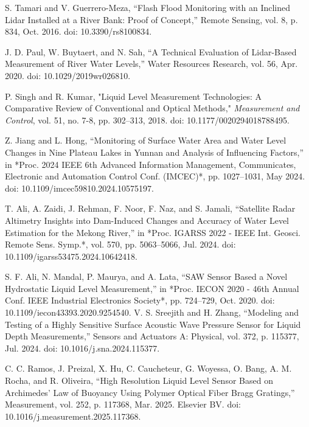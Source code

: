 \documentclass[conference]{IEEEtran}
\begin{document}
\begin{thebibliography}{00}
 S. Tamari and V. Guerrero-Meza, 
``Flash Flood Monitoring with an Inclined Lidar Installed at a River Bank: Proof of Concept,'' 
Remote Sensing, vol. 8, p. 834, Oct. 2016. doi: 10.3390/rs8100834.


 J. D. Paul, W. Buytaert, and N. Sah, 
``A Technical Evaluation of Lidar-Based Measurement of River Water Levels,'' 
Water Resources Research, vol. 56, Apr. 2020. doi: 10.1029/2019wr026810.

P. Singh and R. Kumar, "Liquid Level Measurement Technologies: A Comparative Review of Conventional and Optical Methods," \emph{Measurement and Control}, vol. 51, no. 7-8, pp. 302--313, 2018. doi: 10.1177/0020294018788495.

 Z. Jiang and L. Hong, 
``Monitoring of Surface Water Area and Water Level Changes in Nine Plateau Lakes in Yunnan and Analysis of Influencing Factors,'' 
in *Proc. 2024 IEEE 6th Advanced Information Management, Communicates, Electronic and Automation Control Conf. (IMCEC)*, 
pp. 1027--1031, May 2024. doi: 10.1109/imcec59810.2024.10575197.

 T. Ali, A. Zaidi, J. Rehman, F. Noor, F. Naz, and S. Jamali, 
``Satellite Radar Altimetry Insights into Dam-Induced Changes and Accuracy of Water Level Estimation for the Mekong River,'' 
in *Proc. IGARSS 2022 - IEEE Int. Geosci. Remote Sens. Symp.*, vol. 570, pp. 5063--5066, Jul. 2024. 
doi: 10.1109/igarss53475.2024.10642418.

 S. F. Ali, N. Mandal, P. Maurya, and A. Lata, 
``SAW Sensor Based a Novel Hydrostatic Liquid Level Measurement,'' 
in *Proc. IECON 2020 - 46th Annual Conf. IEEE Industrial Electronics Society*, pp. 724--729, Oct. 2020. 
doi: 10.1109/iecon43393.2020.9254540.
 V. S. Sreejith and H. Zhang, 
``Modeling and Testing of a Highly Sensitive Surface Acoustic Wave Pressure Sensor for Liquid Depth Measurements,'' 
Sensors and Actuators A: Physical, vol. 372, p. 115377, Jul. 2024. doi: 10.1016/j.sna.2024.115377.

 C. C. Ramos, J. Preizal, X. Hu, C. Caucheteur, G. Woyessa, O. Bang, A. M. Rocha, and R. Oliveira, 
``High Resolution Liquid Level Sensor Based on Archimedes’ Law of Buoyancy Using Polymer Optical Fiber Bragg Gratings,'' 
Measurement, vol. 252, p. 117368, Mar. 2025. Elsevier BV. doi: 10.1016/j.measurement.2025.117368.




\end{thebibliography}
\end{document}
